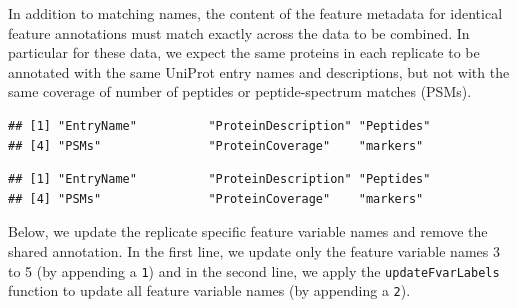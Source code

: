 In addition to matching names, the content of the feature metadata for
identical feature annotations must match exactly across the data to be
combined. In particular for these data, we expect the same proteins in
each replicate to be annotated with the same UniProt entry names and
descriptions, but not with the same coverage of number of peptides or
peptide-spectrum matches (PSMs).

\begin{knitrout}
\color{fgcolor}\begin{kframe}
\begin{alltt}
\end{alltt}
\begin{verbatim}
## [1] "EntryName"          "ProteinDescription" "Peptides"          
## [4] "PSMs"               "ProteinCoverage"    "markers"
\end{verbatim}
\begin{alltt}
\end{alltt}
\begin{verbatim}
## [1] "EntryName"          "ProteinDescription" "Peptides"          
## [4] "PSMs"               "ProteinCoverage"    "markers"
\end{verbatim}
\end{kframe}
\end{knitrout}

Below, we update the replicate specific feature variable names and
remove the shared annotation. In the first line, we update only the
feature variable names 3 to 5 (by appending a \texttt{1}) and in the
second line, we apply the \texttt{updateFvarLabels} function to update
all feature variable names (by appending a \texttt{2}).

